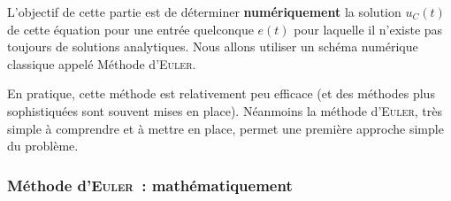 \documentclass[../main/main.tex]{subfiles}
\begin{document}
L'objectif de cette partie est de déterminer \textbf{numériquement} la solution
$u_{C}(t)$ de cette équation pour une entrée quelconque $e(t)$ pour laquelle il
n'existe pas toujours de solutions analytiques. Nous allons utiliser un schéma
numérique classique appelé Méthode d'\textsc{Euler}.

En pratique, cette méthode est relativement peu efficace (et des méthodes plus
sophistiquées sont souvent mises en place). Néanmoins la méthode
d'\textsc{Euler}, très simple à comprendre et à mettre en place, permet une
première approche simple du problème.

\subsubsection{Méthode d'\textsc{Euler}~: mathématiquement}
\label{sssec:euler}
\end{document}
